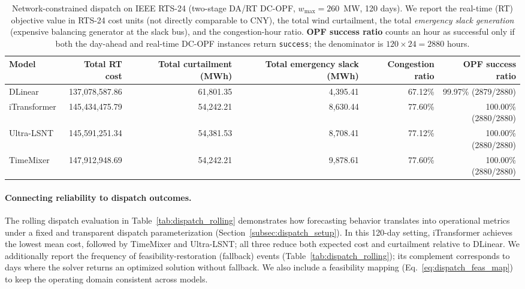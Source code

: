\documentclass[review,3p,times]{elsarticle}
\begin{document}
\begin{table}[t]
\centering
\caption{Network-constrained dispatch on IEEE RTS-24 (two-stage DA/RT DC-OPF, $w_{\max}=260$~MW, 120 days). We report the real-time (RT) objective value in RTS-24 cost units (not directly comparable to CNY), the total wind curtailment, the total \emph{emergency slack generation} (expensive balancing generator at the slack bus), and the congestion-hour ratio. \textbf{OPF success ratio} counts an hour as successful only if both the day-ahead and real-time DC-OPF instances return \texttt{success}; the denominator is $120\times24=2880$ hours.}
\label{tab:dispatch_network_rts24}
\begin{tabular}{lrrrrr}
\toprule
Model & Total RT cost & Total curtailment (MWh) & Total emergency slack (MWh) & Congestion ratio & OPF success ratio \\
\midrule
DLinear & 137,078,587.86 & 61,801.35 & 4,395.41 & 67.12\%  & 99.97\% (2879/2880) \\
iTransformer & 145,434,475.79 & 54,242.21 & 8,630.44 & 77.60\%  & 100.00\% (2880/2880) \\
Ultra-LSNT & 145,591,251.34 & 54,381.53 & 8,708.41 & 77.12\%  & 100.00\% (2880/2880) \\
TimeMixer & 147,912,948.69 & 54,242.21 & 9,878.61 & 77.60\%  & 100.00\% (2880/2880) \\
\bottomrule
\end{tabular}
\end{table}
\paragraph{Connecting reliability to dispatch outcomes.}\label{subsec:disc_dispatch}
The rolling dispatch evaluation in Table~\ref{tab:dispatch_rolling} demonstrates how forecasting behavior translates into operational metrics under a fixed and transparent dispatch parameterization (Section~\ref{subsec:dispatch_setup}). In this 120-day setting, iTransformer achieves the lowest mean cost, followed by TimeMixer and Ultra-LSNT; all three reduce both expected cost and curtailment relative to DLinear. We additionally report the frequency of feasibility-restoration (fallback) events (Table~\ref{tab:dispatch_rolling}); its complement corresponds to days where the solver returns an optimized solution without fallback. We also include a feasibility mapping (Eq.~\ref{eq:dispatch_feas_map}) to keep the operating domain consistent across models.
\end{document}
